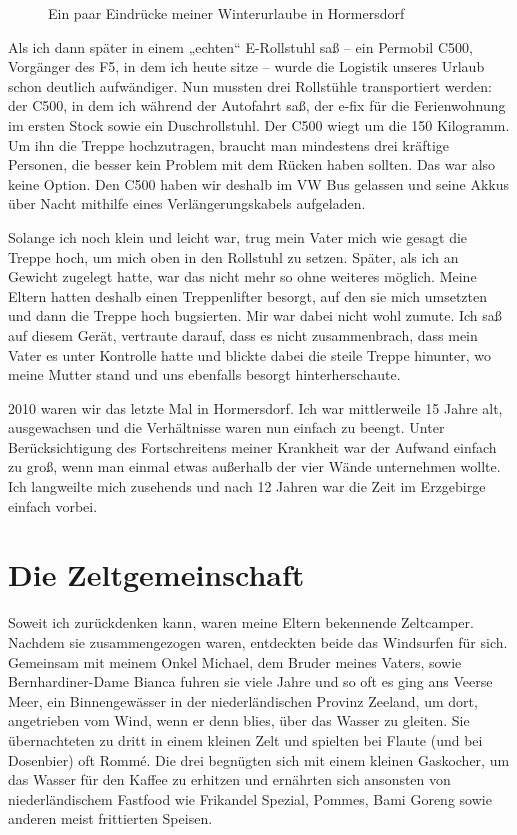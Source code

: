 \documentclass[fontsize=14pt,a4paper,headinclude,DIV=calc,automark]{scrbook}
\begin{document}
\setlength{\fboxsep}{0pt}    %
\setlength{\fboxrule}{0.2pt} %
\begin{figure}[ht]
    \raggedright
    \caption{Ein paar Eindrücke meiner Winterurlaube in Hormersdorf}
    \label{fig:hormersdorfcollection}
\end{figure}

Als ich dann später in einem „echten“ E-Rollstuhl saß – ein Permobil C500, Vorgänger des F5, in dem ich heute sitze – wurde die Logistik unseres Urlaub schon deutlich aufwändiger. Nun mussten drei Rollstühle transportiert werden: der C500, in dem ich während der Autofahrt saß, der e-fix für die Ferienwohnung im ersten Stock sowie ein Duschrollstuhl. Der C500 wiegt um die 150 Kilogramm. Um ihn die Treppe hochzutragen, braucht man mindestens drei kräftige Personen, die besser kein Problem mit dem Rücken haben sollten. Das war also keine Option. Den C500 haben wir deshalb im VW Bus gelassen und seine Akkus über Nacht mithilfe eines Verlängerungskabels aufgeladen.

Solange ich noch klein und leicht war, trug mein Vater mich wie gesagt die Treppe hoch, um mich oben in den Rollstuhl zu setzen. Später, als ich an Gewicht zugelegt hatte, war das nicht mehr so ohne weiteres möglich. Meine Eltern hatten deshalb einen Treppenlifter besorgt, auf den sie mich umsetzten und dann die Treppe hoch bugsierten. Mir war dabei nicht wohl zumute. Ich saß auf diesem Gerät, vertraute darauf, dass es nicht zusammenbrach, dass mein Vater es unter Kontrolle hatte und blickte dabei die steile Treppe hinunter, wo meine Mutter stand und uns ebenfalls besorgt hinterherschaute.

2010 waren wir das letzte Mal in Hormersdorf. Ich war mittlerweile 15 Jahre alt, ausgewachsen und die Verhältnisse waren nun einfach zu beengt. Unter Berücksichtigung des Fortschreitens meiner Krankheit war der Aufwand einfach zu groß, wenn man einmal etwas außerhalb der vier Wände unternehmen wollte. Ich langweilte mich zusehends und nach 12 Jahren war die Zeit im Erzgebirge einfach vorbei.

\section{Die Zeltgemeinschaft}

Soweit ich zurückdenken kann, waren meine Eltern bekennende Zeltcamper. Nachdem sie zusammengezogen waren, entdeckten beide das Windsurfen für sich. Gemeinsam mit meinem Onkel Michael, dem Bruder meines Vaters, sowie Bernhardiner-Dame Bianca fuhren sie viele Jahre und so oft es ging ans Veerse Meer, ein Binnengewässer in der niederländischen Provinz Zeeland, um dort, angetrieben vom Wind, wenn er denn blies, über das Wasser zu gleiten. Sie übernachteten zu dritt in einem kleinen Zelt und spielten bei Flaute (und bei Dosenbier) oft Rommé. Die drei begnügten sich mit einem kleinen Gaskocher, um das Wasser für den Kaffee zu erhitzen und ernährten sich ansonsten von niederländischem Fastfood wie Frikandel Spezial, Pommes, Bami Goreng sowie anderen meist frittierten Speisen.
\end{document}
